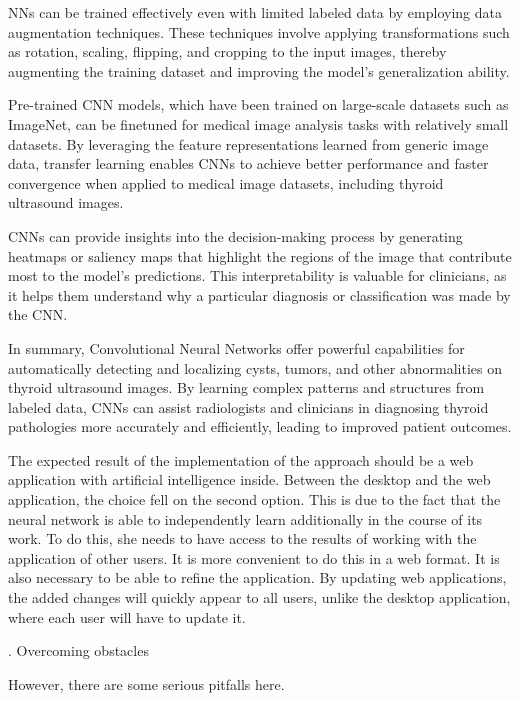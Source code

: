 \documentclass[a4paper,10pt,twocolumn]{article}
\newcommand{\RomanNumeralCaps}[1]
    {\MakeUppercase{\romannumeral #1}}
\begin{document}
NNs can be trained effectively even with limited
labeled data by employing data augmentation techniques.
These techniques involve applying transformations such
as rotation, scaling, flipping, and cropping to the input
images, thereby augmenting the training dataset and
improving the model’s generalization ability.

Pre-trained CNN models, which have been trained
on large-scale datasets such as ImageNet, can be finetuned for medical image analysis tasks with relatively
small datasets. By leveraging the feature representations
learned from generic image data, transfer learning enables CNNs to achieve better performance and faster
convergence when applied to medical image datasets,
including thyroid ultrasound images.

CNNs can provide insights into the decision-making
process by generating heatmaps or saliency maps that
highlight the regions of the image that contribute most
to the model’s predictions. This interpretability is valuable for clinicians, as it helps them understand why a
particular diagnosis or classification was made by the
CNN.

In summary, Convolutional Neural Networks offer
powerful capabilities for automatically detecting and localizing cysts, tumors, and other abnormalities on thyroid
ultrasound images. By learning complex patterns and
structures from labeled data, CNNs can assist radiologists
and clinicians in diagnosing thyroid pathologies more
accurately and efficiently, leading to improved patient
outcomes.

The expected result of the implementation of the
approach should be a web application with artificial
intelligence inside. Between the desktop and the web
application, the choice fell on the second option. This
is due to the fact that the neural network is able to
independently learn additionally in the course of its work.
To do this, she needs to have access to the results of
working with the application of other users. It is more
convenient to do this in a web format. It is also necessary
to be able to refine the application. By updating web
applications, the added changes will quickly appear to
all users, unlike the desktop application, where each user
will have to update it.
\vspace{2 mm}
\begin{center}
    \RomanNumeralCaps{5}. Overcoming obstacles
\end{center}

However, there are some serious pitfalls here.
\end{document}
